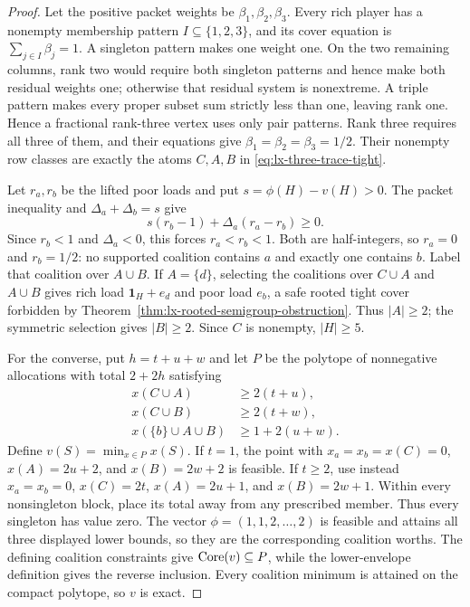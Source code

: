 \begin{proof}
Let the positive packet weights be $\beta_1,\beta_2,\beta_3$.  Every rich
player has a nonempty membership pattern $I\subseteq\{1,2,3\}$, and its cover
equation is $\sum_{j\in I}\beta_j=1$.  A singleton pattern makes one weight
one.  On the two remaining columns, rank two would require both singleton
patterns and hence make both residual weights one; otherwise that residual
system is nonextreme.  A triple pattern makes every proper subset sum strictly less than
one, leaving rank one.  Hence a fractional rank-three vertex uses only pair
patterns.  Rank three requires all three of them, and their equations give
$\beta_1=\beta_2=\beta_3=1/2$.  Their nonempty row classes are exactly the
atoms $C,A,B$ in \eqref{eq:lx-three-trace-tight}.

Let $r_a,r_b$ be the lifted poor loads and put
$s=\phi(H)-v(H)>0$.  The packet inequality and
$\Delta_a+\Delta_b=s$ give
\[
 s(r_b-1)+\Delta_a(r_a-r_b)\geq0.
\]
Since $r_b<1$ and $\Delta_a<0$, this forces $r_a<r_b<1$.
Both are half-integers, so $r_a=0$ and $r_b=1/2$: no supported
coalition contains $a$ and exactly one contains $b$.  Label that coalition
over $A\cup B$.  If $A=\{d\}$, selecting the coalitions over $C\cup A$ and
$A\cup B$ gives rich load $\mathbf1_H+e_d$ and poor load $e_b$, a safe rooted
tight cover forbidden by
Theorem~\ref{thm:lx-rooted-semigroup-obstruction}.  Thus $|A|\geq2$;
the symmetric selection gives $|B|\geq2$.  Since $C$ is nonempty, $|H|\geq5$.

For the converse, put $h=t+u+w$ and let $P$ be the polytope of nonnegative
allocations with
total $2+2h$ satisfying
\[
\begin{aligned}
 x(C\cup A)&\geq2(t+u),\\
 x(C\cup B)&\geq2(t+w),\\
 x(\{b\}\cup A\cup B)&\geq1+2(u+w).
\end{aligned}                                                   \tag{HP}
\label{eq:lx-three-trace-polytope}
\]
Define $v(S)=\min_{x\in P}x(S)$.  If $t=1$, the point with
$x_a=x_b=x(C)=0$, $x(A)=2u+2$, and $x(B)=2w+2$ is feasible.  If $t\geq2$,
use instead $x_a=x_b=0$, $x(C)=2t$, $x(A)=2u+1$, and $x(B)=2w+1$.
Within every nonsingleton block, place its total away from any prescribed
member.  Thus every singleton has value zero.  The vector
$\phi=(1,1,2,\ldots,2)$ is feasible and attains all three displayed lower
bounds, so they are the corresponding coalition worths.  The defining coalition
constraints give $\operatorname{Core}(v)\subseteq P$, while the lower-envelope definition
gives the reverse inclusion.  Every coalition minimum is attained on the
compact polytope, so $v$ is exact.


\end{proof}
